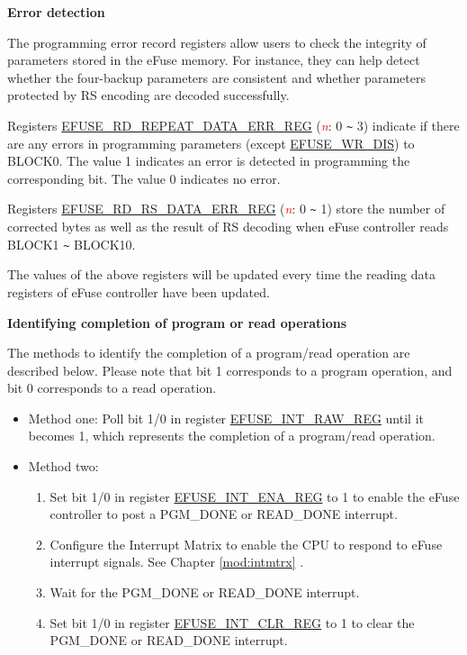 \documentclass[main\_\_EN.tex]{subfiles}
\begin{document}
{\bfseries Error detection}

The programming error record registers allow users to check the integrity of parameters stored in the eFuse memory. For instance, they can help detect whether the four-backup parameters are consistent and whether parameters protected by RS encoding are decoded successfully.

Registers \hyperref[regdesc:EFUSERDREPEATDATAERR0REG]{EFUSE\_RD\_REPEAT\_DATA\_ERR\_REG} (\textcolor{red}{\it{n}}: 0 \verb+~+ 3) indicate if there are any errors in programming parameters (except \hyperref[fielddesc:EFUSEWRDIS]{EFUSE\_WR\_DIS}) to BLOCK0. The value 1 indicates an error is detected in programming the corresponding bit. The value 0 indicates no error.

Registers \hyperref[regdesc:EFUSERDRSDATAERR0REG]{EFUSE\_RD\_RS\_DATA\_ERR\_REG} (\textcolor{red}{\it{n}}: 0 \verb+~+ 1) store the number of corrected bytes as well as the result of RS decoding when eFuse controller reads BLOCK1 \verb+~+ BLOCK10.

The values of the above registers will be updated every time the reading data registers of eFuse controller have been updated.

{\bfseries Identifying completion of program or read operations}

The methods to identify the completion of a program/read operation are described below. Please note that bit 1 corresponds to a program operation, and bit 0 corresponds to a read operation.
\begin{itemize}
    \item Method one: Poll bit 1/0 in register \hyperref[regdesc:EFUSEINTRAWREG]{EFUSE\_INT\_RAW\_REG} until it becomes 1, which represents the completion of a program/read operation.
    \item Method two:
        \begin{enumerate}
            \item Set bit 1/0 in register \hyperref[regdesc:EFUSEINTENAREG]{EFUSE\_INT\_ENA\_REG} to 1 to enable the eFuse controller to post a PGM\_DONE or READ\_DONE interrupt.
            \item Configure the Interrupt Matrix to enable the CPU to respond to eFuse interrupt signals. See Chapter \ref{mod:intmtrx} \textit{}.
            \item Wait for the PGM\_DONE or READ\_DONE interrupt.
            \item Set bit 1/0 in register \hyperref[regdesc:EFUSEINTCLRREG]{EFUSE\_INT\_CLR\_REG} to 1 to clear the PGM\_DONE or READ\_DONE interrupt.
    \end{enumerate}
\end{itemize}
\end{document}
